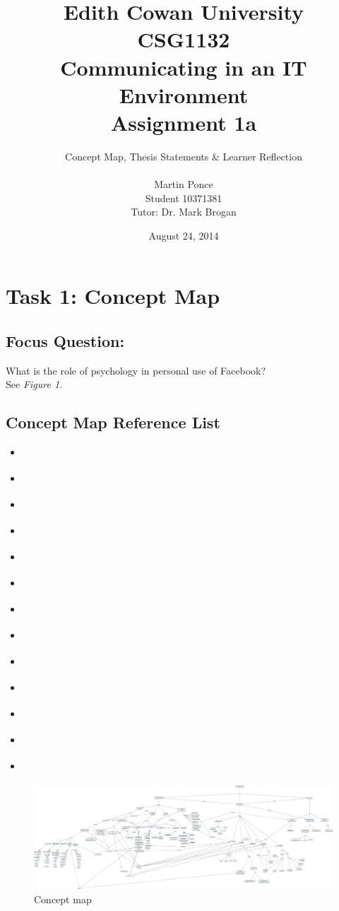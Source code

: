 \documentclass[12pt,a4paper]{report}
\title{Edith Cowan University\\CSG1132\\Communicating in an IT Environment\\Assignment 1a}
\author{Concept Map, Thesis Statements \& Learner Reflection\\\\
		Martin Ponce\\Student 10371381\\Tutor: Dr. Mark Brogan}
\date{August 24, 2014}
\begin{document}
\maketitle

\makeatletter
\tableofcontents

\newpage
\section*{\textsf{Task 1: Concept Map}}

\subsection*{\textsf{Focus Question:}}
What is the role of psychology in personal use of Facebook?\\

See \emph{Figure 1.}

\subsection*{\textsf{Concept Map Reference List}}
\begin{itemize}
\item \citet*{Pai2013}
\item \citet*{McAndrew2012}
\item \citet*{Nadkarni2012}
\item \citet*{Moore2012}
\item \citet*{Ross2009}
\item \citet*{Toma2013}
\item \citet*{Ellison2007}
\item \citet*{Park2011}
\item \citet*{Anderson2012}
\item \citet*{Ku2013}
\item \citet*{Rosen2013}
\item \citet*{Trottier2012}
\item \citet*{Kwan2013}
\end{itemize}

\newpage
{}
\thispagestyle{fancylscape}
\begin{landscape}
\begin{figure}[H]
	\centering
	\caption{Concept map}
	\includegraphics[scale=0.13]{./img/test.png}
\end{figure}
\end{landscape}
\restoregeometry
\end{document}
